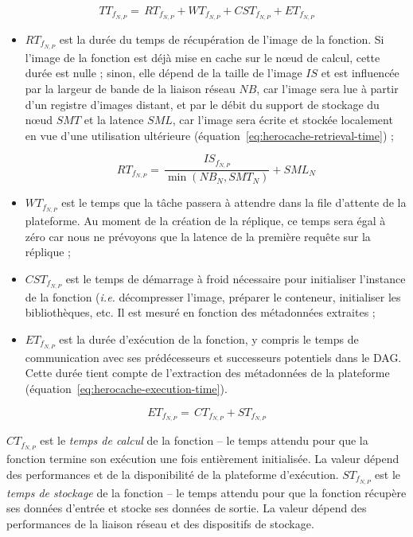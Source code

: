 \begin{equation}
    {TT}_{{f}_{N, P}} = \, {RT}_{{f}_{N, P}} + {WT}_{{f}_{N, P}} + {CST}_{{f}_{N, P}} + {ET}_{{f}_{N, P}}
\label{eq:herocache-total-time-function}
\end{equation}

\begin{itemize}
    \item ${RT}_{{f}_{N, P}}$ est la durée du temps de récupération de l'image de la fonction. Si l'image de la fonction est déjà mise en cache sur le nœud de calcul, cette durée est nulle ; sinon, elle dépend de la taille de l'image $IS$ et est influencée par la largeur de bande de la liaison réseau $NB$, car l'image sera lue à partir d'un registre d'images distant, et par le débit du support de stockage du nœud $SMT$ et la latence $SML$, car l'image sera écrite et stockée localement en vue d'une utilisation ultérieure (équation~\ref{eq:herocache-retrieval-time}) ;

    \begin{equation}
        {RT}_{{f}_{N, P}} = \, \frac{IS_{{f}_{N, P}}}{\min (NB_{N}, SMT_{N})} + SML_{N}
        \label{eq:herocache-retrieval-time}
    \end{equation}

    \item ${WT}_{{f}_{N, P}}$ est le temps que la tâche passera à attendre dans la file d'attente de la plateforme. Au moment de la création de la réplique, ce temps sera égal à zéro car nous ne prévoyons que la latence de la première requête sur la réplique ;
    \item ${CST}_{{f}_{N, P}}$ est le temps de démarrage à froid nécessaire pour initialiser l'instance de la fonction (\textit{i.e.} décompresser l'image, préparer le conteneur, initialiser les bibliothèques, etc. Il est mesuré en fonction des métadonnées extraites ;
    \item ${ET}_{{f}_{N, P}}$ est la durée d'exécution de la fonction, y compris le temps de communication avec ses prédécesseurs et successeurs potentiels dans le DAG. Cette durée tient compte de l'extraction des métadonnées de la plateforme (équation~\ref{eq:herocache-execution-time}).
\end{itemize}

\begin{equation}
    {ET}_{{f}_{N, P}} = \, {CT}_{{f}_{N, P}} + {ST}_{{f}_{N, P}}
\label{eq:herocache-execution-time}
\end{equation}

${CT}_{{f}_{N, P}}$ est le \textit{temps de calcul} de la fonction -- le temps attendu pour que la fonction termine son exécution une fois entièrement initialisée. La valeur dépend des performances et de la disponibilité de la plateforme d'exécution. ${ST}_{{f}_{N, P}}$ est le \textit{temps de stockage} de la fonction -- le temps attendu pour que la fonction récupère ses données d'entrée et stocke ses données de sortie. La valeur dépend des performances de la liaison réseau et des dispositifs de stockage.

